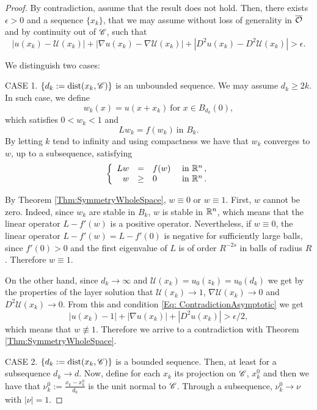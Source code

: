 \begin{proof}
By contradiction, assume that the result does not hold. Then, there exists $\epsilon>0$ and a sequence $\{x_k\}$, that we may assume without loss of generality in $\overline{\mathcal{O}}$ and by continuity out of ${\mathscr{C}}$, such that
\begin{equation}
\label{Eq:ContradictionAsymptotic}
|u(x_k)-\mathcal{U}(x_k)|+|\nabla u(x_k)-\nabla \mathcal{U}(x_k)|+|D^2u(x_k)-D^2\mathcal{U}(x_k)| > \epsilon.
\end{equation}


We distinguish two cases:

CASE 1. $\{d_k:=\operatorname{dist}(x_k,\mathscr{C})\}$ is an unbounded sequence. We may assume $d_k \geq 2k$.\\
In such case, we define
$$
w_k(x) = u(x+x_k)  \ \textrm{for } x\in B_{d_k}(0), 
$$
which satisfies $0<w_k<1$ and
$$
Lw_k = f(w_k) \ \textrm{in } B_k.
$$
By letting $k$ tend to infinity and using compactness  we have that $w_k$ converges to $w$, up to a subsequence, satisfying
$$
\left\{\begin{array}{rcll}
L w &=& f(w) & \textrm{ in }\mathbb{R}^n\,,\\
w &\geq& 0 & \textrm{ in } \mathbb{R}^n\,.
\end{array} \right.
$$

By Theorem \ref{Thm:SymmetryWholeSpace}, $w\equiv 0$ or $w\equiv 1$. First, $w$ cannot be zero. Indeed, since $w_k$ are stable in $B_k$, $w$ is stable in $\mathbb{R}^n$, which means that the linear operator $L-f'(w)$ is a positive operator. Nevertheless, if $w\equiv 0$, the linear operator $L-f'(w) = L-f'(0)$ is negative for sufficiently large balls, since $f'(0)>0$ and the first eigenvalue of $L$ is of order $R^{-2s}$ in balls of radius $R$. Therefore $w\equiv 1$. 

On the other hand, since $d_k\rightarrow \infty$  and $\mathcal{U}(x_k) = u_0(z_k) = u_0(d_k)$ we get by the properties of the layer solution  that $\mathcal{U}(x_k) \rightarrow 1$, $\nabla \mathcal{U}(x_k) \rightarrow 0$ and $D^2\mathcal{U}(x_k) \rightarrow 0$. From this and condition \eqref{Eq: ContradictionAsymptotic} we get
$$
|u(x_k)-1|+|\nabla u(x_k)|+|D^2u(x_k)| > \epsilon/2,
$$
which means that $w \not\equiv 1$. Therefore we arrive to a contradiction with Theorem \ref{Thm:SymmetryWholeSpace}.

CASE 2. $\{d_k:=\operatorname{dist}(x_k,\mathscr{C})\}$ is a bounded sequence.
Then, at least for a subsequence $d_k \rightarrow d$. Now, define for each $x_k$ its projection on $\mathscr{C}$, $x_k^0$ and then we have that $ \nu_k^0 := \frac{x_k-x_k^0}{d_k}$ is the unit normal to $\mathscr{C}$. Through a subsequence, $ \nu_k^0 \rightarrow \nu$ with $|\nu|=1$.


\end{proof}
